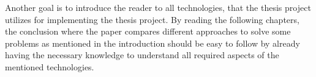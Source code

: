 Another goal is to introduce the reader to all technologies, that the thesis project utilizes for implementing the thesis project. By reading the following chapters, the conclusion where the paper compares different approaches to solve some problems as mentioned in the introduction should be easy to follow by already having the necessary knowledge to understand all required aspects of the mentioned technologies.



